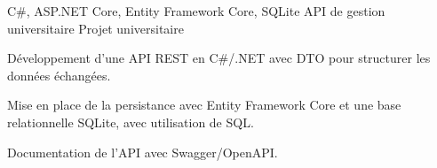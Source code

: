 
\begin{cventries}
  \cventry
    {C\#, ASP.NET Core, Entity Framework Core, SQLite}
    {API de gestion universitaire}
    {Projet universitaire}
    {}
    {
      \begin{cvitems}
        \item {Développement d’une API REST en C\#/.NET avec DTO pour structurer les données échangées.}
        \item {Mise en place de la persistance avec Entity Framework Core et une base relationnelle SQLite, avec utilisation de SQL.}
        \item {Documentation de l’API avec Swagger/OpenAPI.}
      \end{cvitems}
    }
\end{cventries}

